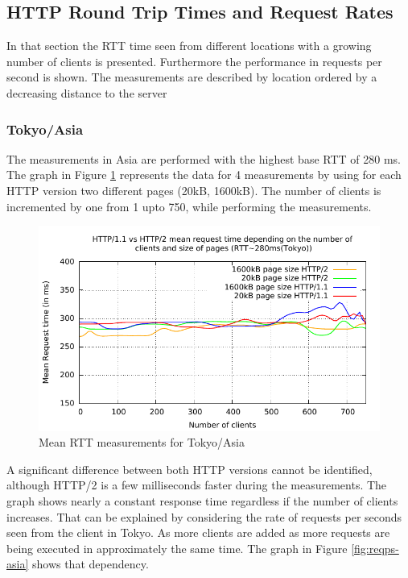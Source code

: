 \subsection{HTTP Round Trip Times and Request Rates}
\label{subsec:rtt}

In that section the RTT time seen from different locations with a growing number of clients is presented. Furthermore the performance in requests per second is shown. The measurements are described by location ordered by a decreasing distance to the server

\subsubsection{Tokyo/Asia}

The measurements in Asia are performed with the highest base RTT of 280 ms. The graph in Figure \ref{fig:latency-asia}  represents the data for 4 measurements by using for each HTTP version two different pages (20kB, 1600kB). The number of clients is incremented by one  from 1 upto 750, while performing the measurements.

\begin{figure}[H]
	\centering
	\includegraphics[scale=1,trim=0.0cm .0cm .0cm .0cm,clip]{images/latency-asia.pdf}
	\caption{Mean RTT measurements for Tokyo/Asia}
	\label{fig:latency-asia}
\end{figure}

A significant difference between both HTTP versions cannot be identified, although HTTP/2 is a few milliseconds faster during the measurements. The graph shows nearly a constant response time regardless if the number of clients increases. That can be explained by considering the rate of requests per seconds seen from the client in Tokyo. As more clients are added as more requests are being executed in approximately the same time. The graph in Figure \ref{fig:reqps-asia} shows that dependency.

